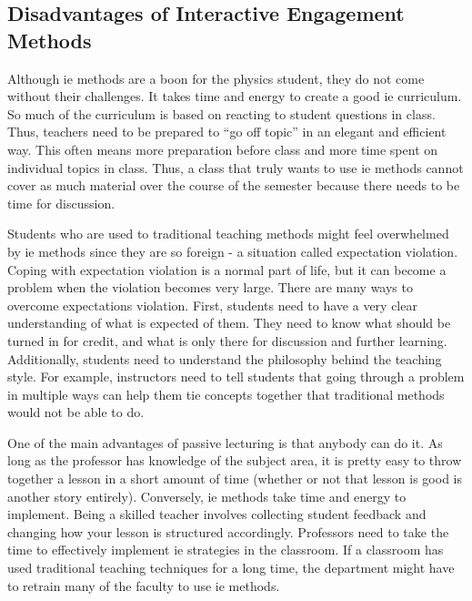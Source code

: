 \subsection{Disadvantages of Interactive Engagement Methods}

Although \gls{ie} methods are a boon for the physics student, they do not come without their challenges. It takes time and energy to create a good \gls{ie} curriculum. So much of the curriculum is based on reacting to student questions in class. Thus, teachers need to be prepared to ``go off topic'' in an elegant and efficient way. This often means more preparation before class and more time spent on individual topics in class. Thus, a class that truly wants to use \gls{ie} methods cannot cover as much material over the course of the semester because there needs to be time for discussion.

Students who are used to traditional teaching methods might feel overwhelmed by \gls{ie} methods since they are so foreign - a situation called expectation violation. Coping with expectation violation is a normal part of life, but it can become a problem when the violation becomes very large\cite{gigliotti1987, marian2006}. There are many ways to overcome expectations violation. First, students need to have a very clear understanding of what is expected of them. They need to know what should be turned in for credit, and what is only there for discussion and further learning. Additionally, students need to understand the philosophy behind the teaching style. For example, instructors need to tell students that going through a problem in multiple ways can help them tie concepts together that traditional methods would not be able to do.

One of the main advantages of passive lecturing is that anybody can do it. As long as the professor has knowledge of the subject area, it is pretty easy to throw together a lesson in a short amount of time (whether or not that lesson is good is another story entirely). Conversely, \gls{ie} methods take time and energy to implement. Being a skilled teacher involves collecting student feedback and changing how your lesson is structured accordingly. Professors need to take the time to effectively implement \gls{ie} strategies in the classroom. If a classroom has used traditional teaching techniques for a long time, the department might have to retrain many of the faculty to use \gls{ie} methods.

